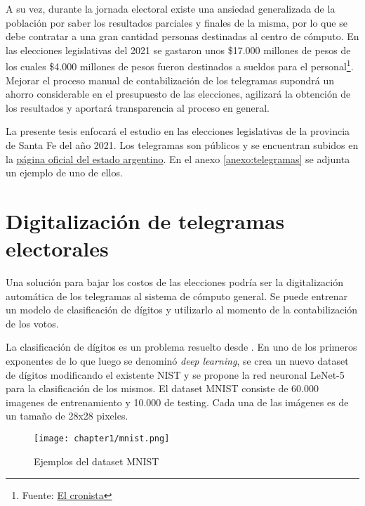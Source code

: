 A su vez, durante la jornada electoral existe una ansiedad generalizada de la poblaci\'on por saber los resultados
parciales y finales de la misma, por lo que se debe contratar a una gran cantidad personas destinadas al centro de
c\'omputo. En las elecciones legislativas del 2021 se gastaron unos \$17.000 millones de pesos de los cuales \$4.000
millones de pesos fueron destinados a sueldos para el personal\footnote{Fuente:
    \href{https://www.cronista.com/economia-politica/Elecciones-legislativas-2021-cuanto-mas-se-gastara-por-el-coronavirus-segun-el-Presupuesto-20201004-0006.html}{El
        cronista}}. Mejorar el proceso manual de contabilizaci\'on de los telegramas supondr\'a un ahorro considerable en el
presupuesto de las elecciones, agilizar\'a la obtenci\'on de los resultados y aportar\'a transparencia al proceso en
general.

La presente tesis enfocar\'a el estudio en las elecciones legislativas de la provincia de Santa Fe del a\~{n}o 2021.
Los telegramas son p\'ublicos y se encuentran subidos en la
\href{https://op.elecciones.gob.ar/telegramas/generales2021/}{p\'agina oficial del estado argentino}. En el anexo
\ref{anexo:telegramas} se adjunta un ejemplo de uno de ellos.

\section{Digitalizaci\'on de telegramas electorales}

Una soluci\'on para bajar los costos de las elecciones podr\'ia ser la digitalizaci\'on autom\'atica de los telegramas
al sistema de c\'omputo general. Se puede entrenar un modelo de clasificaci\'on de d\'igitos y utilizarlo al momento de
la contabilizaci\'on de los votos.

La clasificaci\'on de d\'igitos es un problema resuelto desde \citeyear{lecun1998gradient}. En uno de los primeros
exponentes de lo que luego se denomin\'o {\it deep learning}, \cite{lecun1998gradient} se crea un nuevo dataset de
d\'igitos modificando el existente NIST y se propone la red neuronal LeNet-5 para la clasificaci\'on de los mismos. El
dataset MNIST consiste de 60.000 imagenes de entrenamiento y 10.000 de testing. Cada una de las im\'agenes es de un
tama\~{n}o de 28x28 pixeles.

\begin{figure}[H]
    \centering
    \texttt{[image: chapter1/mnist.png]}
    \caption{Ejemplos del dataset MNIST}
    \label{fig:mnist}
\end{figure}

